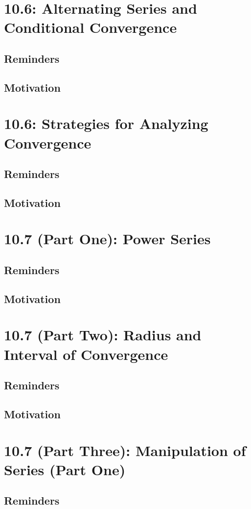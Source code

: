 \documentclass{report}
\begin{document}
\begin{sloppypar}
\chapter{10.6: Alternating Series and Conditional Convergence}
\section{Reminders}
\section{Motivation}
\chapter{10.6: Strategies for Analyzing Convergence}
\section{Reminders}
\section{Motivation}
\chapter{10.7 (Part One): Power Series}
\section{Reminders}
\section{Motivation}
\chapter{10.7 (Part Two): Radius and Interval of Convergence}
\section{Reminders}
\section{Motivation}
\chapter{10.7 (Part Three): Manipulation of Series (Part One)}
\section{Reminders}

\end{sloppypar}
\end{document}
